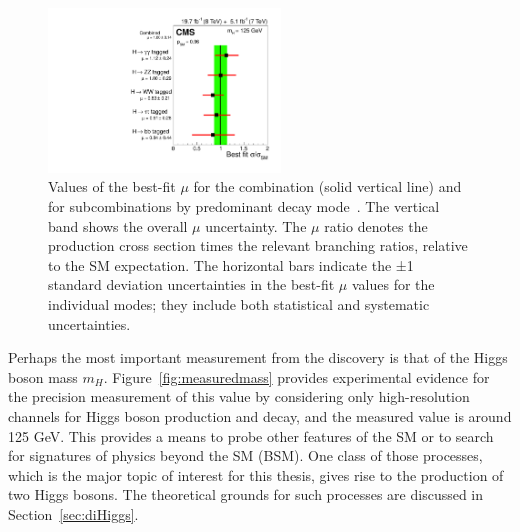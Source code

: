 \begin{figure}[ht]
 \begin{center}
    \includegraphics[width=0.55\textwidth]{figures/intro/sqr_mlz_ccc_mH125_decay.pdf}
      \end{center}
\caption{Values of the best-fit $\mu$ for the combination (solid vertical line) and for subcombinations by predominant decay mode~\cite{Khachatryan:1979247}. The vertical band shows the overall $\mu$ uncertainty. The $\mu$ ratio denotes the production cross section times the relevant branching ratios, relative to the SM expectation. The horizontal bars indicate the ±1 standard deviation uncertainties in the best-fit $\mu$ values for the individual modes; they include both statistical and systematic uncertainties.}
\label{fig:measuredxsec_decay}
\end{figure}

Perhaps the most important measurement from the discovery is that of the Higgs boson mass $m_H$.
Figure~\ref{fig:measuredmass} provides experimental evidence for the precision measurement of this
value by considering only high-resolution channels for Higgs boson production and decay, and
the measured value is around 125 GeV. This provides a means to probe other features of the SM
or to search for signatures of physics beyond the SM (BSM). One class of those processes, which
is the major topic of interest for this thesis, gives rise to the production of two Higgs bosons.
The theoretical grounds for such processes are discussed in
Section~\ref{sec:diHiggs}.


